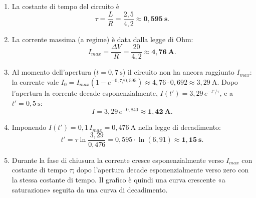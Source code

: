 \begin{question}[ID=1.11, subtitle={Circuito RL chiuso e poi aperto — correnti in funzione del tempo}, tags={induzione magnetica, circuito RL}, difficulty=difficile]
\begin{solution}
\begin{enumerate}
    \item La costante di tempo del circuito è
    \[
    \tau = \frac{L}{R} = \frac{2{,}5}{4{,}2} \approx \mathbf{0{,}595\ \text{s}}.
    \]
    \item La corrente massima (a regime) è data dalla legge di Ohm:
    \[
    I_{max} = \frac{\Delta V}{R} = \frac{20}{4{,}2} \approx \mathbf{4{,}76\ \text{A}}.
    \]
    \item Al momento dell'apertura ($t = 0{,}7\ \text{s}$) il circuito non ha ancora raggiunto $I_{max}$: la corrente vale $I_0 = I_{max}(1 - e^{-0{,}7/0{,}595}) \approx 4{,}76\cdot 0{,}692 \approx 3{,}29\ \text{A}$. Dopo l'apertura la corrente decade esponenzialmente, $I(t') = 3{,}29\,e^{-t'/\tau}$, e a $t' = 0{,}5\ \text{s}$:
    \[
    I = 3{,}29\,e^{-0{,}840} \approx \mathbf{1{,}42\ \text{A}}.
    \]
    \item Imponendo $I(t') = 0{,}1\,I_{max} = 0{,}476\ \text{A}$ nella legge di decadimento:
    \[
    t' = \tau\ln\!\frac{3{,}29}{0{,}476} = 0{,}595\cdot\ln(6{,}91) \approx \mathbf{1{,}15\ \text{s}}.
    \]
    \item Durante la fase di chiusura la corrente cresce esponenzialmente verso $I_{max}$ con costante di tempo $\tau$; dopo l'apertura decade esponenzialmente verso zero con la stessa costante di tempo. Il grafico è quindi una curva crescente «a saturazione» seguita da una curva di decadimento.
\end{enumerate}
\end{solution}
\end{question}

